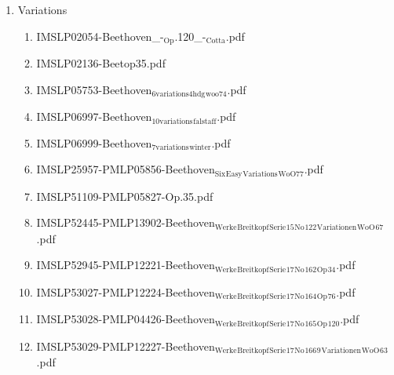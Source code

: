 \documentclass[11pt]{article}
\begin{document}
\begin{enumerate}
\begin{enumerate}
\item Variations
\label{sec-1-1-1-1-44-9-6-9}
\begin{enumerate}
\item IMSLP02054-Beethoven\_-$_{\text{Op}}$.120\_-$_{\text{Cotta}}$.pdf
\label{sec-1-1-1-1-44-9-6-9-1}

\item IMSLP02136-Beetop35.pdf
\label{sec-1-1-1-1-44-9-6-9-2}

\item IMSLP05753-Beethoven$_{\text{6variations4hdg}}$$_{\text{woo74}}$.pdf
\label{sec-1-1-1-1-44-9-6-9-3}

\item IMSLP06997-Beethoven$_{\text{10variations}}$$_{\text{falstaff}}$.pdf
\label{sec-1-1-1-1-44-9-6-9-4}

\item IMSLP06999-Beethoven$_{\text{7variations}}$$_{\text{winter}}$.pdf
\label{sec-1-1-1-1-44-9-6-9-5}

\item IMSLP25957-PMLP05856-Beethoven$_{\text{Six}}$$_{\text{Easy}}$$_{\text{Variations}}$$_{\text{WoO77}}$.pdf
\label{sec-1-1-1-1-44-9-6-9-6}

\item IMSLP51109-PMLP05827-Op.35.pdf
\label{sec-1-1-1-1-44-9-6-9-7}

\item IMSLP52445-PMLP13902-Beethoven$_{\text{Werke}}$$_{\text{Breitkopf}}$$_{\text{Serie}}$$_{\text{15}}$$_{\text{No}}$$_{\text{122}}$$_{\text{Variationen}}$$_{\text{WoO}}$$_{\text{67}}$.pdf
\label{sec-1-1-1-1-44-9-6-9-8}

\item IMSLP52945-PMLP12221-Beethoven$_{\text{Werke}}$$_{\text{Breitkopf}}$$_{\text{Serie}}$$_{\text{17}}$$_{\text{No}}$$_{\text{162}}$$_{\text{Op}}$$_{\text{34}}$.pdf
\label{sec-1-1-1-1-44-9-6-9-9}

\item IMSLP53027-PMLP12224-Beethoven$_{\text{Werke}}$$_{\text{Breitkopf}}$$_{\text{Serie}}$$_{\text{17}}$$_{\text{No}}$$_{\text{164}}$$_{\text{Op}}$$_{\text{76}}$.pdf
\label{sec-1-1-1-1-44-9-6-9-10}

\item IMSLP53028-PMLP04426-Beethoven$_{\text{Werke}}$$_{\text{Breitkopf}}$$_{\text{Serie}}$$_{\text{17}}$$_{\text{No}}$$_{\text{165}}$$_{\text{Op}}$$_{\text{120}}$.pdf
\label{sec-1-1-1-1-44-9-6-9-11}

\item IMSLP53029-PMLP12227-Beethoven$_{\text{Werke}}$$_{\text{Breitkopf}}$$_{\text{Serie}}$$_{\text{17}}$$_{\text{No}}$$_{\text{166}}$$_{\text{9}}$$_{\text{Variationen}}$$_{\text{WoO}}$$_{\text{63}}$.pdf
\label{sec-1-1-1-1-44-9-6-9-12}


\end{enumerate}
\end{enumerate}
\end{enumerate}
\end{document}

